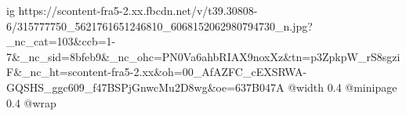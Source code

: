  
 
 
 
 

\ifcmt
  ig https://scontent-fra5-2.xx.fbcdn.net/v/t39.30808-6/315777750_5621761651246810_6068152062980794730_n.jpg?_nc_cat=103&ccb=1-7&_nc_sid=8bfeb9&_nc_ohc=PN0Va6ahbRIAX9noxXz&tn=p3ZpkpW_rS8sgziF&_nc_ht=scontent-fra5-2.xx&oh=00_AfAZFC_cEXSRWA-GQSHS_ggc609_f47BSPjGnwcMu2D8wg&oe=637B047A
  @width 0.4
  @minipage 0.4
  @wrap \parpic[r]
\fi
